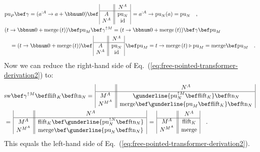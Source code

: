 \begin{align*}
 & \text{pu}_{P}\bef\gamma=(a^{:A}\rightarrow a+\bbnum 0)\bef\,\begin{array}{|c||c|}
 & N^{A}\\
\hline A & \text{pu}_{N}\\
N^{A} & \text{id}
\end{array}\,=a^{:A}\rightarrow\text{pu}_{N}(a)=\text{pu}_{N}\quad,\\
 & (t\rightarrow\bbnum 0+\text{merge}\,(t))\bef\text{pu}_{M}\bef\gamma^{\uparrow M}=(t\rightarrow\bbnum 0+\text{merge}\,(t))\bef\gamma\bef\text{pu}_{M}\\
 & \quad=(t\rightarrow\bbnum 0+\text{merge}\,(t))\bef\,\begin{array}{|c||c|}
 & N^{A}\\
\hline A & \text{pu}_{N}\\
N^{A} & \text{id}
\end{array}\,\bef\text{pu}_{M}=t\rightarrow\text{merge}\,(t)\triangleright\text{pu}_{M}=\text{merge}\bef\text{pu}_{M}\quad.
\end{align*}
Now we can reduce the right-hand side of Eq.~(\ref{eq:free-pointed-transformer-derivation2})
to:
\begin{align*}
 & \text{sw}\bef\gamma^{\uparrow M}\bef\text{flift}_{K}\bef\text{ftn}_{N}=\,\begin{array}{|c||c|}
 & N^{A}\\
\hline M^{A} & \gunderline{\text{pu}_{N}^{\uparrow M}\bef\text{flift}_{K}}\bef\text{ftn}_{N}\\
N^{M^{A}} & \text{merge}\bef\gunderline{\text{pu}_{M}\bef\text{flift}_{K}}\bef\text{ftn}_{N}
\end{array}\\
 & =\,\begin{array}{|c||c|}
 & N^{A}\\
\hline M^{A} & \text{flift}_{K}\bef\gunderline{\text{pu}_{N}^{\uparrow N}\bef\text{ftn}_{N}}\\
N^{M^{A}} & \text{merge}\bef\gunderline{\text{pu}_{N}\bef\text{ftn}_{N}}
\end{array}\,=\,\begin{array}{|c||c|}
 & N^{A}\\
\hline M^{A} & \text{flift}_{K}\\
N^{M^{A}} & \text{merge}
\end{array}\quad.
\end{align*}
This equals the left-hand side of Eq.~(\ref{eq:free-pointed-transformer-derivation2}).


